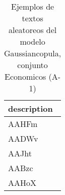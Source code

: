 \begin{table}[H]
\centering
\fontsize{8}{14}\selectfont
\caption{Ejemplos de textos aleatoreos del modelo Gaussiancopula, conjunto Economicos (A-1)}
\label{table-sample10-economicos-a-1-gaussiancopula-text}
\begin{tabular}{|m{50em}|}
\hline
\rowcolor[gray]{0.8}
description \\
\hline AAHFm \\
\hline AADWv \\
\hline AAJht \\
\hline AABzc \\
\hline AAHoX \\
\hline
\end{tabular}
\end{table}
